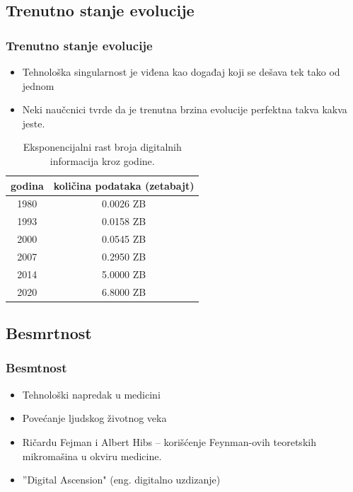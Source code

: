 \documentclass{beamer}
\begin{document}
\subsection{Trenutno stanje evolucije}
\begin{frame}[fragile]\frametitle{Trenutno stanje evolucije}
	\begin{itemize}	
		\item Tehnološka singularnost je viđena kao događaj koji se dešava tek tako od
jednom
            \item Neki naučcnici tvrde da je trenutna brzina evolucije perfektna takva kakva
jeste.
	\end{itemize}
 
        \begin{table}[h!]
            \begin{center}
                \begin{tabular}{|c|c|} \hline
                    \textbf{godina}& \textbf{količina podataka (zetabajt)}\\ \hline
                        1980 &0.0026 ZB\\ \hline
                        1993 &0.0158 ZB\\ \hline
                        2000 &0.0545 ZB\\ \hline
                        2007 &0.2950 ZB\\ \hline
                        2014 &5.0000 ZB\\ \hline
                        2020 &6.8000 ZB\\ \hline
                \end{tabular}
            \caption{Eksponencijalni rast broja digitalnih informacija kroz godine.}
            \label{tab:tabela1}
            \end{center}
        \end{table}
\end{frame}
\subsection{Besmrtnost}
\begin{frame}[fragile]\frametitle{Besmtnost}
	\begin{itemize}	
        \item Tehnološki napredak u medicini
        \item Povećanje ljudskog životnog veka
        \item Ričardu Fejman i Albert Hibs – korišćenje Feynman-ovih teoretskih mikromašina u okviru medicine.
        \item ''Digital Ascension" (eng. digitalno uzdizanje)
	\end{itemize}
\end{frame}
\end{document}
